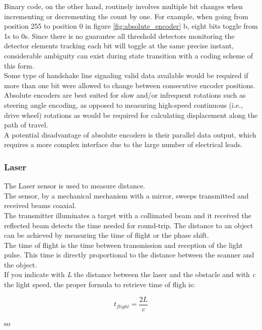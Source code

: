 Binary code, on the other hand, routinely involves multiple bit changes when
incrementing or decrementing the count by one. For example, when going from
position 255 to position 0 in figure \ref{fig:absolute_encoder} b, eight
bits toggle from 1s to 0s. Since
there is no guarantee all threshold detectors monitoring the detector elements
tracking each bit will toggle at the same precise instant, considerable ambiguity
can exist during state transition with a coding scheme of this form.
\\
Some type of handshake line signaling valid data available would be required
if more than one bit were allowed to change between consecutive encoder positions.
\\
Absolute encoders are best suited for slow and/or infrequent rotations such
as steering angle encoding, as opposed to measuring high-speed continuous
(i.e., drive wheel) rotations as would be required for calculating displacement
along the path of travel.
\\
A potential disadvantage of absolute encoders is their parallel data output,
which requires a more complex interface due to the large number of electrical leads.


\subsubsection{Laser}
\label{sec:mobile:laser}

The Laser sensor is used to measure distance.
\\
The sensor, by a mechanical mechanism with a mirror, sweeps
transmitted and received beams coaxial.
\\

The transmitter illuminates a target with a collimated beam
and it received the reflected beam detects the time needed for
round-trip. The distance to an object can be achieved by measuring
the time of flight or the phase shift.
\\
The time of flight is the time between transmission and reception
of the light pulse. This time is directly proportional to the distance
between the scanner and the object.
\\
If you indicate with \textit{L} the distance between the laser and
the obstacle and with \textit{c} the light speed, the proper formula
to retrieve time of fligh is:

\[
t_{flight} = \frac{2L}{c}
\]

so

